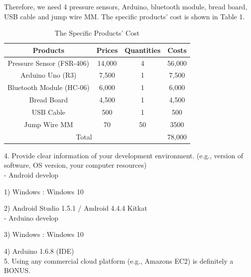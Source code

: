 \documentclass[conference]{IEEEtran}
\begin{document}
Therefore, we need 4 pressure sensors, Arduino, bluetooth module, bread board, USB cable and jump wire MM. The specific products' cost is shown in Table 1.\\
\begin{center}

\begin{table}[H]
\caption{The Specific Products' Cost }
\begin{tabular}{|c|c|c|c|}\hline


Products & Prices & Quantities & Costs \\ \hline \hline

Pressure Sensor (FSR-406) & 14,000 & 4 & 56,000  \\ \hline 

Arduino Uno (R3) & 7,500 & 1 & 7,500 \\ \hline

Bluetooth Module (HC-06) & 6,000 & 1  & 6,000 \\ \hline

Bread Board & 4,500 & 1 & 4,500 \\\hline

USB Cable & 500 & 1 & 500  \\ \hline

Jump Wire MM& 70 & 50 & 3500  \\ \hline

\multicolumn{3}{|c|}{Total} & \multicolumn{1}{|l|}{78,000} \\ \hline 

\end{tabular}
\end{table}
\end{center}

4.	Provide clear information of your development environment. (e.g., version of software, OS version, your computer resources)\\

-	Android develop

1)	Windows : Windows 10

2)	Android Studio 1.5.1 / Android 4.4.4 Kitkat\\

-	Arduino develop 

3)	Windows : Windows 10

4)	Arduino 1.6.8 (IDE)\\


5.	Using any commercial cloud platform (e.g., Amazons EC2) is definitely a BONUS.\\
\end{document}
